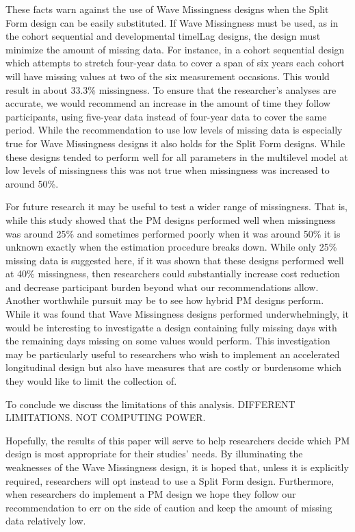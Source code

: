 \documentclass{svjour3}                     %
\begin{document}
These facts warn against the use of Wave Missingness designs when the Split Form design can be easily substituted. If Wave Missingness must be used, as in the cohort sequential and developmental timelLag designs, the design must minimize the amount of missing data. For instance, in a cohort sequential design which attempts to stretch four-year data to cover a span of six years each cohort will have missing values at two of the six measurement occasions. This would result in about 33.3\% missingness. To ensure that the researcher's analyses are accurate, we would recommend an increase in the amount of time they follow participants, using five-year data instead of four-year data to cover the same period. While the recommendation to use low levels of missing data is especially true for Wave Missingness designs it also holds for the Split Form designs. While these designs tended to perform well for all parameters in the multilevel model at low levels of missingness this was not true when missingness was increased to around 50\%. \par

For future research it may be useful to test a wider range of missingness. That is, while this study showed that the PM designs performed well when missingness was around 25\% and sometimes performed poorly when it was around 50\% it is unknown exactly when the estimation procedure breaks down. While only 25\% missing data is suggested here, if it was shown that these designs performed well at 40\% missingness, then researchers could substantially increase cost reduction and decrease participant burden beyond what our recommendations allow. Another worthwhile pursuit may be to see how hybrid PM designs perform. While it was found that Wave Missingness designs performed underwhelmingly, it would be interesting to investigatte a design containing fully missing days with the remaining days missing on some values would perform. This investigation may be particularly useful to researchers who wish to implement an accelerated longitudinal design but also have measures that are costly or burdensome which they would like to limit the collection of. \par

To conclude we discuss the limitations of this analysis. DIFFERENT LIMITATIONS. NOT COMPUTING POWER.

Hopefully, the results of this paper will serve to help researchers decide which PM design is most appropriate for their studies' needs. By illuminating the weaknesses of the Wave Missingness design, it is hoped that, unless it is explicitly required, researchers will opt instead to use a Split Form design. Furthermore, when researchers do implement a PM design we hope they follow our recommendation to err on the side of caution and keep the amount of missing data relatively low. \par



\end{document}
